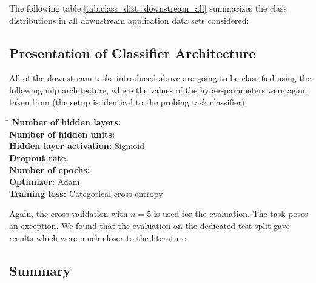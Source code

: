 The following table \vref{tab:class_dist_downstream_all} summarizes the class distributions in all downstream application data sets considered:



\subsection{Presentation of Classifier Architecture}
\label{sec:downstream_tasks_classifier}

All of the downstream tasks introduced above are going to be classified using the following \gls{mlp} architecture, where the values of the hyper-parameters were again taken from \citep{Perone.2018} (the setup is identical to the probing task classifier):

\begin{tabbing}
	\hspace*{8.5cm}\=\kill
	\textbf{Number of hidden layers:} 													\\[4mm]
	\textbf{Number of hidden units:}							 						\\[4mm]
	\textbf{Hidden layer activation:}							\> Sigmoid	 				\\[4mm]
	\textbf{Dropout rate:}									 						\\[4mm]
	\textbf{Number of epochs:}								 						\\[4mm]
	\textbf{Optimizer:} 									\> Adam 						\\[4mm]
	\textbf{Training loss:} 								\> Categorical cross-entropy
\end{tabbing}

Again, the cross-validation with $n = 5$ is used for the evaluation. The  task poses an exception. We found that the evaluation on the dedicated test split gave results which were much closer to the literature.

\subsection{Summary}
\label{sec:downstream_appl_summary}

